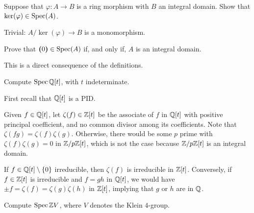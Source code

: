 \begin{exr}
    Suppose that\/ $\varphi: A \to B$ is a ring morphism with\/ $B$ an integral domain. Show that\/ $\ker(\varphi) \in \operatorname{Spec}(A)$.
\end{exr}

\begin{solution}
    Trivial: $A/\ker(\varphi)\to B$ is a monomorphism.
\end{solution}

\begin{exr}
    Prove that\/ $\textrm{\boldmath$($}0\textrm{\boldmath$)$} \in \operatorname{Spec}(A)$ if, and only if, $A$ is an integral domain.
\end{exr}

\begin{solution}
    This is a direct consequence of the definitions.
\end{solution}

\begin{exr}
    Compute $\operatorname{Spec}\mathbb{Q}[t]$, with $t$ indeterminate.
\end{exr}

\begin{solution}
    First recall that $\mathbb{Q}[t]$ is a PID.
    
    Given $f\in\mathbb{Q}[t]$, let $\zeta(f)\in\mathbb{Z}[t]$ be the associate of $f$ in $\mathbb{Q}[t]$ with positive principal coefficient, and no common divisor among its coefficients. Note that $\zeta(fg)=\zeta(f)\zeta(g)$. Otherwise, there would be some $p$ prime with $\zeta(f)\zeta(g)=0$ in $\mathbb{Z}/p\mathbb{Z}[t]$, which is not the case because $\mathbb{Z}/p\mathbb{Z}[t]$ is an integral domain.
    
    If $f\in\mathbb{Q}[t]\setminus\{0\}$ irreducible, then $\zeta(f)$ is irreducible in $\mathbb{Z}[t]$. Conversely, if $f\in\mathbb{Z}[t]$ is irreducible and $f=gh$ in $\mathbb{Q}[t]$, we would have $\pm f=\zeta(f)=\zeta(g)\zeta(h)$ in $\mathbb{Z}[t]$, implying that $g$ or $h$ are in $\mathbb{Q}$.
\end{solution}

\begin{exr}
    Compute\/ $\operatorname{Spec}\mathbb{Z} V$, where\/ $V$ denotes the Klein\/ $4$-group.
\end{exr}


